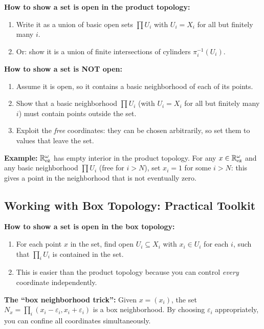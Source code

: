 \documentclass{article}
\begin{document}
\textbf{How to show a set is open in the product topology:}
\begin{enumerate}
  \item Write it as a union of basic open sets $\prod U_i$ with $U_i =
    X_i$ for all but finitely many $i$.
  \item Or: show it is a union of finite intersections of cylinders
    $\pi_i^{-1}(U_i)$.
\end{enumerate}

\textbf{How to show a set is NOT open:}
\begin{enumerate}
  \item Assume it is open, so it contains a basic neighborhood of each
    of its points.
  \item Show that a basic neighborhood $\prod U_i$ (with $U_i = X_i$
    for all but finitely many $i$) must contain points outside the set.
  \item Exploit the \emph{free} coordinates: they can be chosen
    arbitrarily, so set them to values that leave the set.
\end{enumerate}

\textbf{Example:} $\mathbb{R}^\omega_{\mathrm{ez}}$ has empty interior in the
product topology. For any $x \in \mathbb{R}^\omega_{\mathrm{ez}}$ and any basic
neighborhood $\prod U_i$ (free for $i > N$), set $x_i = 1$ for some $i
> N$: this gives a point in the neighborhood that is not eventually
zero.

\subsection{Working with Box Topology: Practical Toolkit}

\textbf{How to show a set is open in the box topology:}
\begin{enumerate}
  \item For each point $x$ in the set, find open $U_i \subseteq X_i$
    with $x_i \in U_i$ for each $i$, such that $\prod_i U_i$ is
    contained in the set.
  \item This is easier than the product topology because you can control
    \emph{every} coordinate independently.
\end{enumerate}

\textbf{The ``box neighborhood trick'':} Given $x = (x_i)$, the set
$N_x = \prod_i (x_i - \varepsilon_i, x_i + \varepsilon_i)$ is a box
neighborhood. By choosing $\varepsilon_i$ appropriately, you can confine
all coordinates simultaneously.
\end{document}
